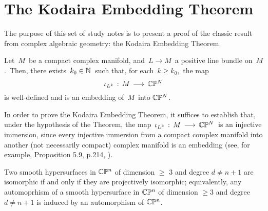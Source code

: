 

\section{The Kodaira Embedding Theorem}
\setcounter{theorem}{0}
\setcounter{equation}{0}


\renewcommand{\theenumi}{\roman{enumi}}
\renewcommand{\labelenumi}{\textnormal{(\theenumi)}$\;\;$}


The purpose of this set of study notes is to present a proof
of the classic result from complex algebraic geometry:
the Kodaira Embedding Theorem.

\begin{theorem}
\mbox{}
\vskip 0.1cm
\noindent
Let \,$M$\, be a compact complex manifold,
and \,$L \longrightarrow M$\, a positive line bundle on \,$M$.\,
Then, there exists \,$k_{0} \in \mathbb{N}$\, such that, for each \,$k \geq k_{0}$,\,
the map
\begin{equation*}
\iota_{L^{k}} \, : \, M \, \longrightarrow \, \mathbb{C}\mathbb{P}^{N}
\end{equation*}
is well-defined and is an embedding of \,$M$\, into $\mathbb{C}\mathbb{P}^{N}$.
\end{theorem}


\begin{remark}
\mbox{}
\vskip 0.1cm
\noindent
In order to prove the Kodaira Embedding Theorem, it suffices to establish that,
under the hypothesis of the Theorem, the map
\,$\iota_{L^{k}} \, : \, M \, \longrightarrow \, \mathbb{C}\mathbb{P}^{N}$\,
is an injective immersion, since every injective immersion from a compact complex manifold
into another (not necessarily compact) complex manifold is an embedding
(see, for example, Proposition 5.9, p.214, \cite{FritzscheGrauert2002}).
\end{remark}


\begin{theorem}
\mbox{}
\vskip 0.1cm
\noindent
Two smooth hypersurfaces in $\mathbb{C}\mathbb{P}^{n}$
of dimension $\geq$ $3$ and degree $d \neq n + 1$
are isomorphic if and only if they are projectively isomorphic;
equivalently, any automoprhism of a smooth hypersurface
in $\mathbb{C}\mathbb{P}^{n}$ of dimension $\geq 3$ and degree $d \neq n+ 1$
is induced by an automorphism of $\mathbb{C}\mathbb{P}^{n}$.
\end{theorem}


